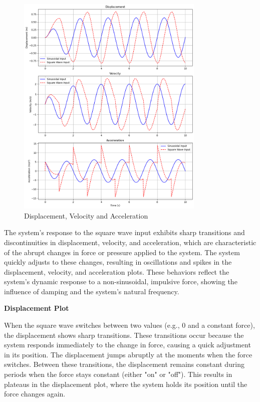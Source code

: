 \documentclass[12pt,a4paper]{article}
\begin{document}
{\vspace{10pt}}

\begin{figure}[H]
    \centering
    \includegraphics[width=0.8\textwidth]{disp_vel_acc.png  } 
    \caption{Displacement, Velocity and Acceleration }
    \label{fig:system}
\end{figure}
{\vspace{10pt}}

The system’s response to the square wave input exhibits sharp transitions and discontinuities in displacement, velocity, and acceleration, which are characteristic of the abrupt changes in force or pressure applied to the system. The system quickly adjusts to these changes, resulting in oscillations and spikes in the displacement, velocity, and acceleration plots. These behaviors reflect the system's dynamic response to a non-sinusoidal, impulsive force, showing the influence of damping and the system’s natural frequency.
\vspace{5pt}

\noindent\textbf{Displacement Plot }  

When the square wave switches between two values (e.g., 0 and a constant force), the displacement shows sharp transitions. These transitions occur because the system responds immediately to the change in force, causing a quick adjustment in its position. The displacement jumps abruptly at the moments when the force switches. Between these transitions, the displacement remains constant during periods when the force stays constant (either "on" or "off"). This results in plateaus in the displacement plot, where the system holds its position until the force changes again.  
\vspace{5pt}  
\end{document}
